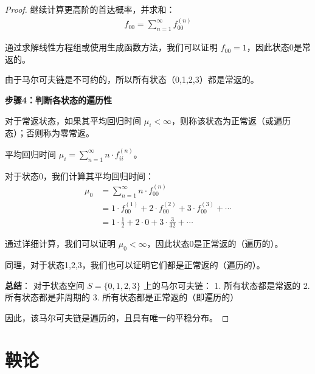 \documentclass[lang=cn,10pt,thmcnt=section]{elegantbook}
\begin{document}
\begin{proof}
继续计算更高阶的首达概率，并求和：
\begin{align}
f_{00} = \sum_{n=1}^{\infty} f_{00}^{(n)}
\end{align}

通过求解线性方程组或使用生成函数方法，我们可以证明 $f_{00} = 1$，因此状态0是常返的。

由于马尔可夫链是不可约的，所以所有状态（0,1,2,3）都是常返的。

\textbf{步骤4：判断各状态的遍历性}

对于常返状态，如果其平均回归时间 $\mu_i < \infty$，则称该状态为正常返（或遍历态）；否则称为零常返。

平均回归时间 $\mu_i = \sum_{n=1}^{\infty} n \cdot f_{ii}^{(n)}$。

对于状态0，我们计算其平均回归时间：
\begin{align}
\mu_0 &= \sum_{n=1}^{\infty} n \cdot f_{00}^{(n)}\\
&= 1 \cdot f_{00}^{(1)} + 2 \cdot f_{00}^{(2)} + 3 \cdot f_{00}^{(3)} + \cdots\\
&= 1 \cdot \frac{1}{2} + 2 \cdot 0 + 3 \cdot \frac{3}{32} + \cdots
\end{align}

通过详细计算，我们可以证明 $\mu_0 < \infty$，因此状态0是正常返的（遍历的）。

同理，对于状态1,2,3，我们也可以证明它们都是正常返的（遍历的）。

\textbf{总结}：
对于状态空间 $S = \{0, 1, 2, 3\}$ 上的马尔可夫链：
1. 所有状态都是常返的
2. 所有状态都是非周期的
3. 所有状态都是正常返的（即遍历的）

因此，该马尔可夫链是遍历的，且具有唯一的平稳分布。
\end{proof}

\chapter{鞅论}
\end{document}

